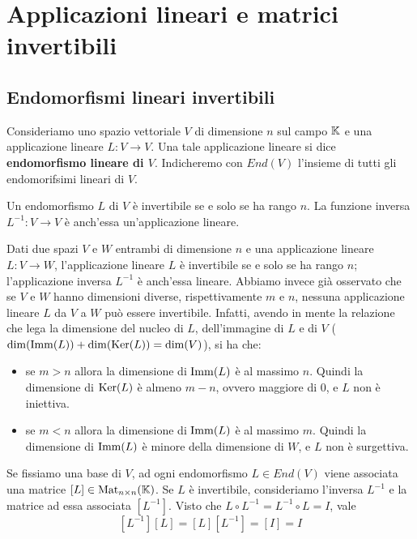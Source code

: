 \chapter{Applicazioni lineari e matrici invertibili}
\section{Endomorfismi lineari invertibili}

\begin{definition}
	Consideriamo uno spazio vettoriale $V$ di dimensione $n$ sul campo $\mathbb{K}$ e
	una applicazione lineare $L : V \to V$. Una tale applicazione lineare si dice
	\textbf{endomorfismo lineare di $V$}. Indicheremo con $End(V)$ l'insieme di tutti gli
	endomorifsimi lineari di $V$.
\end{definition}

\begin{proposition}
	Un endomorfismo $L$ di $V$ è invertibile se e solo se ha rango $n$. La
	funzione inversa $L^{-1} : V \to V$ è anch'essa un'applicazione lineare.
\end{proposition}

\begin{observation}
	Dati due spazi $V$ e $W$ entrambi di dimensione $n$ e una applicazione lineare
	$L : V \to W$, l'applicazione lineare $L$ è invertibile se e solo se ha rango
	$n$; l'applicazione inversa $L^{-1}$ è anch'essa lineare.
	Abbiamo invece già osservato che se $V$ e $W$ hanno dimensioni diverse,
	rispettivamente $m$ e $n$, nessuna applicazione lineare $L$ da $V$ a $W$ può
	essere invertibile. Infatti, avendo in mente la relazione che lega la dimensione
	del nucleo di $L$, dell'immagine di $L$ e di $V$
	($\dim(\operatorname{Imm}(L)) + \dim(\operatorname{Ker}(L)) = \dim(V)$), si ha che:
	\begin{itemize}
		\item se $m > n$ allora la dimensione di $\operatorname{Imm}(L)$ è al massimo $n$.
		      Quindi la dimensione di $\operatorname{Ker}(L)$ è almeno $m - n$, ovvero
		      maggiore di 0, e $L$ non è iniettiva.
		\item se $m < n$ allora la dimensione di $\operatorname{Imm}(L)$ è al massimo $m$.
		      Quindi la dimensione di $\operatorname{Imm}(L)$ è minore della dimensione di
		      $W$, e $L$ non è surgettiva.
	\end{itemize}
\end{observation}

Se fissiamo una base di $V$, ad ogni endomorfismo $L \in End(V)$ viene associata
una matrice $[L] \in \operatorname{Mat}_{n \times n}(\mathbb{K})$. Se $L$ è invertibile,
consideriamo l'inversa $L^{-1}$ e la matrice ad essa associata $[L^{-1}]$.
Visto che $L \circ L^{-1} = L^{-1} \circ L = I$, vale
\[
	[L^{-1}][L] = [L][L^{-1}] = [I] = I
\]


